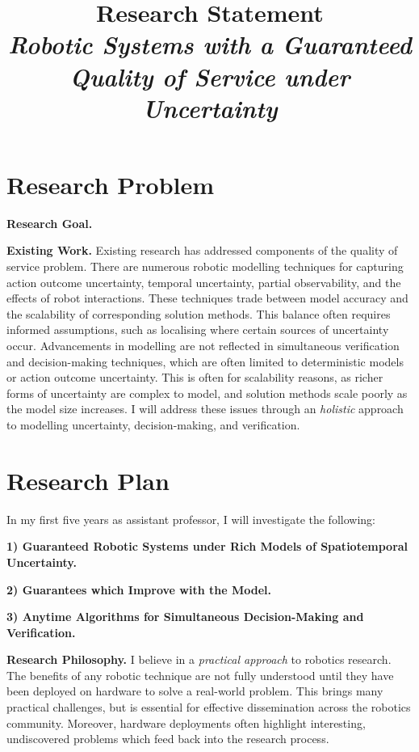 \documentclass[12pt]{article}
\title{Research Statement\\ \large \emph{Robotic Systems with a Guaranteed Quality of Service under Uncertainty}}
\date{}
\author{}
\begin{document}
\maketitle
\thispagestyle{empty}

\section*{Research Problem}

\vspace*{1ex}\noindent\textbf{Research Goal.}

\vspace*{1ex}\noindent\textbf{Existing Work.} Existing research has addressed components of the quality of service problem.
%
There are numerous robotic modelling techniques for capturing action outcome uncertainty, temporal uncertainty, partial observability, and the effects of robot interactions.
%
These techniques trade between model accuracy and the scalability of corresponding solution methods.
%
This balance often requires informed assumptions, such as localising where certain sources of uncertainty occur.
%
Advancements in modelling are not reflected in simultaneous verification and decision-making techniques, which are often limited to deterministic models or action outcome uncertainty.
%
This is often for scalability reasons, as richer forms of uncertainty are complex to model, and solution methods scale poorly as the model size increases.
%
I will address these issues through an \emph{holistic} approach to modelling uncertainty, decision-making, and verification.

\section*{Research Plan}

In my first five years as assistant professor, I will investigate the following:

\vspace*{1ex}\noindent\textbf{1) Guaranteed Robotic Systems under Rich Models of Spatiotemporal Uncertainty.}

\vspace*{1ex}\noindent\textbf{2) Guarantees which Improve with the Model.}

\vspace*{1ex}\noindent\textbf{3) Anytime Algorithms for Simultaneous Decision-Making and Verification.}

\vspace*{1ex}\noindent\textbf{Research Philosophy.} I believe in a \emph{practical approach} to robotics research.
%
The benefits of any robotic technique are not fully understood until they have been deployed on hardware to solve a real-world problem.
%
This brings many practical challenges, but is essential for effective dissemination across the robotics community.
%
Moreover, hardware deployments often highlight interesting, undiscovered problems which feed back into the research process.
\end{document}
